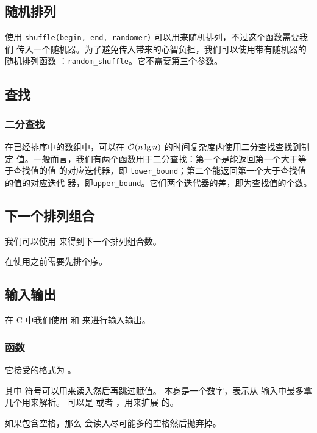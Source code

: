 \subsection{随机排列}
使用 \verb|shuffle(begin, end, randomer)| 可以用来随机排列，不过这个函数需要我们
传入一个随机器。为了避免传入带来的心智负担，我们可以使用带有随机器的随机排列函数
：\verb|random_shuffle|。它不需要第三个参数。



\subsection{查找}
\subsubsection{二分查找}
在已经排序中的数组中，可以在 $\mathcal{O}(n\lg n)$ 的时间复杂度内使用二分查找查找到制定
值。一般而言，我们有两个函数用于二分查找：第一个是能返回第一个大于等于查找值的值
的对应迭代器，即 \verb|lower_bound|；第二个能返回第一个大于查找值的值的对应迭代
器，即\verb|upper_bound|。它们两个迭代器的差，即为查找值的个数。



\subsection{下一个排列组合}
我们可以使用  来得到下一个排列组合数。

在使用之前需要先排个序。



\subsection{输入输出}
在 C 中我们使用  和  来进行输入输出。

\subsubsection{函数 \protect{}}
它接受的格式为 。

其中 \cmd{*} 符号可以用来读入然后再跳过赋值。 本身是一个数字，表示从
输入中最多拿几个用来解析。 可以是  或者 ，用来扩展
 的。

如果包含空格，那么  会读入尽可能多的空格然后抛弃掉。

